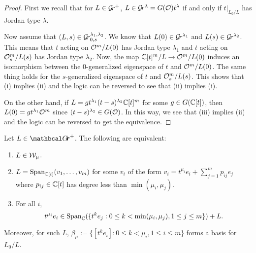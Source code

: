 \documentclass[draft]{article}
\begin{document}
\begin{proof}
First we recall that for $ L \in \mathcal{G}\!r^+$, $ L \in \mathcal{G}\!r^{\lambda} = G(\mathcal O)t^\lambda $ if and only if $ t |_{L_0/L} $ has Jordan type $ \lambda$. 

    Now assume that $ (L, s) \in \mathcal{G}\!r^{\lambda_1, \lambda_2}_{0,s}$. We know that  $ L(0) \in \mathcal{G}\!r^{\lambda_1}$ and $L(s) \in \mathcal{G}\!r^{\lambda_2} $.  This means that $t $ acting on 
    $\mathcal O^m/L(0)$ has Jordan type $ \lambda_1$ and $ t$ acting on 
    $\mathcal O_s^m/L(s)$ has Jordan type $ \lambda_2$.  Now, the map 
    $\mathbb C[t]^m/L\to \mathcal O^m/L(0)$ induces an isomorphism between the $0$-generalized eigenspace of $ t$ and $ \mathcal O^m / L(0)$.   The same thing holds for the $s$-generalized eigenspace of $t $ and $ \mathcal O_s^m/L(s)$. This shows that (i) implies (ii) and the logic can be reversed to see that (ii) implies (i). 
    
    On the other hand, if $ L = g t^{\lambda_1} (t-s)^{\lambda_2} \mathbb C[t]^m$ for some $ g \in G(\mathbb C[t])$, then $ L(0) = g t^{\lambda_1}\mathcal O^m $ since 
    $ (t-s)^{\lambda_2} \in G(\mathcal O)$. In this way, we see that (iii) implies (ii) and the logic can be reversed to get the equivalence.
\end{proof}

\begin{lemma} \label{le:Wmu}
    Let $ L \in \Grth^+$.  The following are equivalent:
    \begin{enumerate}
        \item $ L \in \mathcal W_\mu$.
                \item $ L = \operatorname{Span}_{\mathbb C[t]}(v_1, \dots, v_m)$ for some $ v_i $ of the form $ v_i = t^{\mu_i} e_i + \sum_{j=1}^m p_{ij} e_j $ where $ p_{ij} \in \mathbb C[t] $ has degree less than $ \min(\mu_i, \mu_j)$.
        \item  For all $ i $, 
        $$ t^{\mu_i} e_i \in \operatorname{Span}_\mathbb C(\{t^k e_j : 0 \le k < \min(\mu_i, \mu_j), 1 \le j \le m \}) + L. $$
    \end{enumerate}
    Moreover, for such $L $, $ \beta_\mu := \{ [t^k e_i] : 0 \le k < \mu_i, 1 \le i \le m\}$ forms a basis for $ L_0/L$. 
\end{lemma}

\end{document}
